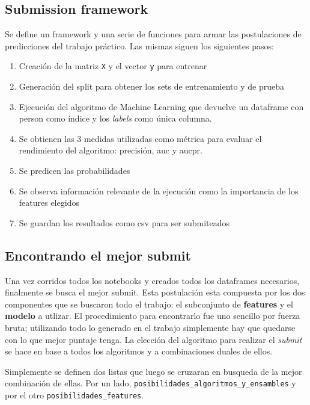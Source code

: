 \documentclass[a4paper]{article}
\begin{document}
\subsection{Submission framework}

Se define un framework y una serie de funciones para armar las postulaciones de predicciones del trabajo práctico. Las mismas siguen los siguientes pasos:

\begin{enumerate}
	\item Creación de la matriz \texttt{X} y el vector \texttt{y} para entrenar
	\item Generación del split para obtener los sets de entrenamiento y de prueba
	\item Ejecución del algoritmo de Machine Learning que devuelve un dataframe con person como índice y los \textit{labels} como única columna.
	\item Se obtienen las 3 medidas utilizadas como métrica para evaluar el rendimiento del algoritmo: precisión, auc y aucpr.
	\item Se predicen las probabilidades 
	\item Se observa información relevante de la ejecución como la importancia de los features elegidos
	\item Se guardan los resultados como csv para ser submiteados
\end{enumerate}

\subsection{Encontrando el mejor submit}

Una vez corridos todos los notebooks y creados todos los dataframes necesarios, finalmente se busca el mejor submit. Esta postulación esta compuesta por los dos componentes que se buscaron todo el trabajo: el subconjunto de \textbf{features} y el \textbf{modelo} a utlizar. El procedimiento para encontrarlo fue uno sencillo por fuerza bruta; utilizando todo lo generado en el trabajo simplemente hay que quedarse con lo que mejor puntaje tenga. La elección del algoritmo para realizar el \textit{submit} se hace en base a todos los algoritmos y a combinaciones duales de ellos.

Simplemente se definen dos listas que luego se cruzaran en busqueda de la mejor combinación de ellas. Por un lado, \texttt{posibilidades\_algoritmos\_y\_ensambles} y por el otro \texttt{posibilidades\_features}.
\end{document}
